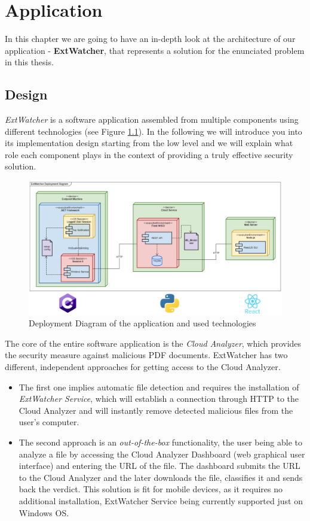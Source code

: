 \chapter{Application}
\label{chapter:application}
In this chapter we are going to have an in-depth look at the architecture of our application - \textbf{ExtWatcher}, that represents a solution for the enunciated problem in this thesis.


\section{Design}
\label{section:design}
\textit{ExtWatcher} is a software application assembled from multiple components using different technologies (see Figure \ref{deployment}). In the following we will introduce you into its implementation design starting from the low level and we will explain what role each component plays in the context of providing a truly effective security solution. 

\begin{figure}[H]
	\centerline{\includegraphics[scale=0.4]{figures/deployTech.png}}  
	\caption{Deployment Diagram of the application and used technologies}
	\label{deployment}
\end{figure}

The core of the entire software application is the \textit{Cloud Analyzer}, which provides the security measure against malicious PDF documents. ExtWatcher has two different, independent approaches for getting access to the Cloud Analyzer. 

\begin{itemize}
	\item The first one implies automatic file detection and requires the installation of \textit{ExtWatcher Service}, which will establish a connection through HTTP to the Cloud Analyzer and will instantly remove detected malicious files from the user's computer.
	\item The second approach is an \textit{out-of-the-box} functionality, the user being able to analyze a file by accessing the Cloud Analyzer Dashboard (web graphical user interface) and entering the URL of the file. The dashboard submits the URL to the Cloud Analyzer and the later downloads the file, classifies it and sends back the verdict. This solution is fit for mobile devices, as it requires no additional installation, ExtWatcher Service being currently supported just on Windows OS.
\end{itemize}


